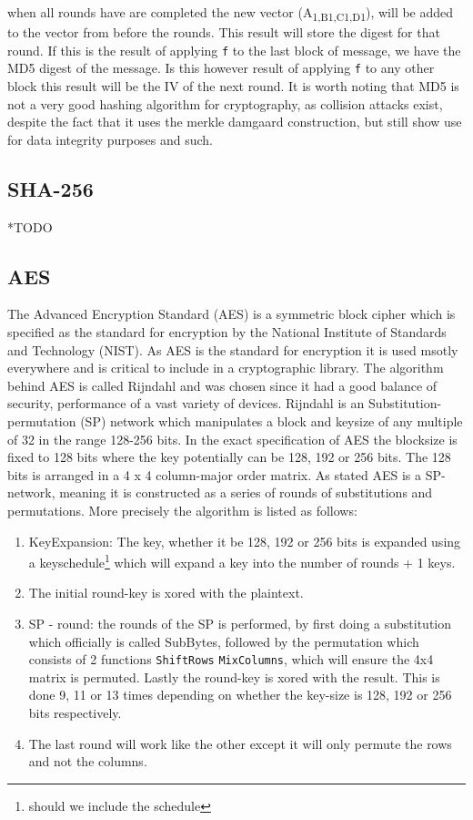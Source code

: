 \documentclass[a4paper]{article}
\begin{document}
when all rounds have are completed the new vector (A\textsubscript{1,B}\textsubscript{1,C}\textsubscript{1,D}\textsubscript{1}), will be added to the vector from before the rounds. This result will store the digest for that round. If this is the result of applying \texttt{f} to the last block of message, we have the MD5 digest of the message. Is this however result of applying \texttt{f} to any other block this result will be the IV of the next round.
It is worth noting that MD5 is not a very good hashing algorithm for cryptography, as collision attacks exist, despite the fact that it uses the merkle damgaard construction, but still show use for data integrity purposes and such.
\subsection{SHA-256}
\label{SHAalg}
*TODO
\subsection{AES}
\label{AESalg}
The Advanced Encryption Standard (AES) is a symmetric block cipher which is specified as the standard for encryption by the National Institute of Standards and Technology (NIST). As AES is the standard for encryption it is used msotly everywhere and is critical to include in a cryptographic library. The algorithm behind AES is called Rijndahl and was chosen since it had a good balance of security, performance of a vast variety of devices\cite{AESofficial}. Rijndahl is an Substitution-permutation (SP) network which manipulates a block and keysize of any multiple of 32 in the range 128-256 bits. In the exact specification of AES the blocksize is fixed to 128 bits where the key potentially can be 128, 192 or 256 bits. The 128 bits is arranged in a 4 x 4 column-major order matrix. As stated AES is a SP-network, meaning it is constructed as a series of rounds of substitutions and permutations. More precisely the algorithm is listed as follows:
\begin{enumerate}
\item KeyExpansion: The key, whether it be 128, 192 or 256 bits is expanded using a keyschedule\footnote{should we include the schedule} which will expand a key into the number of rounds + 1 keys.
\item The initial round-key is xored with the plaintext.
\item SP - round: the rounds of the SP is performed, by first doing a substitution which officially is called SubBytes\cite{Rijndahl}, followed by the permutation which consists of 2 functions \texttt{ShiftRows} \texttt{MixColumns}, which will ensure the 4x4 matrix is permuted. Lastly the round-key is xored with the result. This is done 9, 11 or 13 times depending on whether the key-size is 128, 192 or 256 bits respectively.
\item The last round will work like the other except it will only permute the rows and not the columns.
\end{enumerate}
\end{document}
